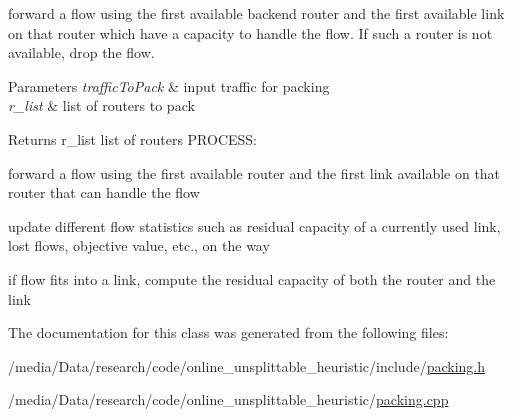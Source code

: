 forward a flow using the first available backend router and the first available link on that router which have a capacity to handle the flow. \-If such a router is not available, drop the flow. 
\begin{DoxyParams}{\-Parameters}
{\em traffic\-To\-Pack} & input traffic for packing \\
\hline
{\em r\-\_\-list} & list of routers to pack \\
\hline
\end{DoxyParams}
\begin{DoxyReturn}{\-Returns}
r\-\_\-list list of routers \-P\-R\-O\-C\-E\-S\-S\-:
\begin{DoxyItemize}
\item forward a flow using the first available router and the first link available on that router that can handle the flow
\item update different flow statistics such as residual capacity of a currently used link, lost flows, objective value, etc., on the way 
\end{DoxyItemize}
\end{DoxyReturn}
if flow fits into a link, compute the residual capacity of both the router and the link 

\-The documentation for this class was generated from the following files\-:\begin{DoxyCompactItemize}
\item 
/media/\-Data/research/code/online\-\_\-unsplittable\-\_\-heuristic/include/\hyperlink{packing_8h}{packing.\-h}\item 
/media/\-Data/research/code/online\-\_\-unsplittable\-\_\-heuristic/\hyperlink{packing_8cpp}{packing.\-cpp}\end{DoxyCompactItemize}
